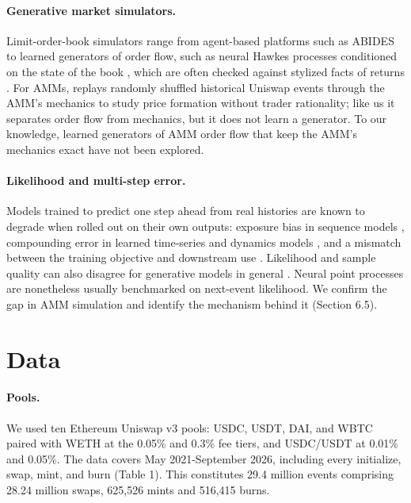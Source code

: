 \documentclass[11pt]{article}
\begin{document}
\paragraph{Generative market simulators.} Limit-order-book simulators range from agent-based platforms such as ABIDES \citep{byrd2020abides} to learned generators of order flow, such as neural Hawkes processes conditioned on the state of the book \citep{shi2022sdpnhp}, which are often checked against stylized facts of returns \citep{cont2001stylized}. For AMMs, \citet{palit2022shuffled} replays randomly shuffled historical Uniswap events through the AMM's mechanics to study price formation without trader rationality; like us it separates order flow from mechanics, but it does not learn a generator. To our knowledge, learned generators of AMM order flow that keep the AMM's mechanics exact have not been explored.

\paragraph{Likelihood and multi-step error.} Models trained to predict one step ahead from real histories are known to degrade when rolled out on their own outputs: exposure bias in sequence models \citep{bengio2015scheduled,ranzato2016sequence}, compounding error in learned time-series and dynamics models \citep{venkatraman2015improving}, and a mismatch between the training objective and downstream use \citep{lambert2020objective}. Likelihood and sample quality can also disagree for generative models in general \citep{theis2016note}. Neural point processes are nonetheless usually benchmarked on next-event likelihood. We confirm the gap in AMM simulation and identify the mechanism behind it (Section 6.5).

\section{Data}

\paragraph{Pools.} We used ten Ethereum Uniswap v3 pools: USDC, USDT, DAI, and WBTC paired with WETH at the 0.05\% and 0.3\% fee tiers, and USDC/USDT at 0.01\% and 0.05\%. The data covers May 2021-September 2026, including every initialize, swap, mint, and burn (Table 1). This constitutes 29.4 million events comprising 28.24 million swaps, 625,526 mints and 516,415 burns.
\end{document}
